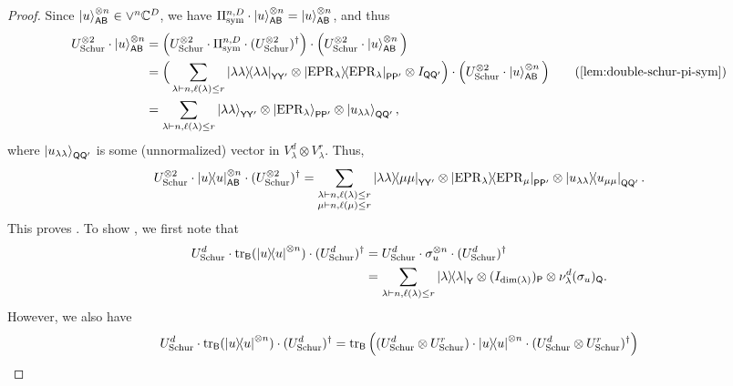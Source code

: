 \begin{proof}
    Since $\ket{u}^{\otimes n}_{\mathsf{AB}} \in \lor^n \mathbb C^D$, we have $\Pi_{\mathrm{sym}}^{n,D} \cdot \ket{u}^{\otimes n}_{\mathsf{AB}} = \ket{u}^{\otimes n}_{\mathsf{AB}}$, and thus 
    \begin{align*}
        \schur^{\otimes 2} \cdot \ket{u}^{\otimes n}_{\reg{AB}} & = \Big(\schur^{\otimes 2} \cdot \Pi_{\mathrm{sym}}^{n,D} \cdot (\schur^{\otimes 2})^\dagger\Big) \cdot  \Big(\schur^{\otimes 2} \cdot \ket{u}^{\otimes n}_{\reg{AB}}\Big) \\
        & = \Big(\sum_{\lambda \vdash n, \ell(\lambda) \leq r} \ketbra{\lambda \lambda}_{\reg{YY'}} \otimes \ketbra{\epr_\lambda}_{\reg{PP'}} \otimes I_{\reg{QQ'}} \Big) \cdot \Big(\schur^{\otimes 2} \cdot \ket{u}_{\reg{AB}}^{\otimes n}\Big) \tag{\Cref{lem:double-schur-pi-sym}} \\ 
        & = \sum_{\lambda \vdash n, \ell(\lambda) \leq r} \ket{\lambda\lambda}_{\reg{YY'}} \otimes \ket{\epr_\lambda}_{\reg{PP'}} \otimes \ket{u_{\lambda \lambda}}_{\reg{QQ'}},
    \end{align*}
    where $\ket{u_{\lambda \lambda}}_{\mathsf{QQ'}}$ is some (unnormalized) vector in $V^d_\lambda \otimes V^r_\lambda$. Thus, 
    \begin{align*}
        U_{\mathrm{Schur}}^{\otimes 2} \cdot \ketbra{u}_{\mathsf{AB}}^{\otimes n} \cdot ( U_{\mathrm{Schur}}^{\otimes 2} )^\dagger = \sum_{\substack{\lambda \vdash n, \ell(\lambda) \leq r \\ \mu \vdash n, \ell(\mu) \leq r}} \ketbra{\lambda \lambda}{\mu \mu}_{\mathsf{YY'}} \otimes \ketbra{\mathrm{EPR}_\lambda}{\mathrm{EPR}_\mu}_{\mathsf{PP'}} \otimes \ketbra{u_{\lambda \lambda}}{u_{\mu \mu}}_{\mathsf{QQ'}}. 
    \end{align*}
    This proves . To show , we first note that 
\begin{align}
    U_{\mathrm{Schur}}^d \cdot \tr_{\mathsf{B}}( \ketbra{u}^{\otimes n} ) \cdot (U_{\mathrm{Schur}}^d)^\dagger & = U_{\mathrm{Schur}}^d \cdot \sigma_u^{\otimes n} \cdot (U_{\mathrm{Schur}}^d)^\dagger \nonumber \\
    & = \sum_{\lambda \vdash n, \ell(\lambda) \leq r} \ketbra{\lambda}_{\mathsf{Y}} \otimes (I_{\dim(\lambda)})_{\mathsf{P}} \otimes \nu_\lambda^d(\sigma_u)_{\mathsf{Q}}.\label{eq:double_schur_eq_1}
\end{align} 
However, we also have 
\begin{align}
    \schur^d \cdot \tr_{\reg{B}}( \ketbra{u}^{\otimes n} ) \cdot (\schur^d)^\dagger & = \tr_{\reg{B}} \Big(  (\schur^d \otimes \schur^r) \cdot  \ketbra{u}^{\otimes n}  \cdot (\schur^d \otimes \schur^r)^\dagger\Big) \nonumber \\

\end{align}
\end{proof}
